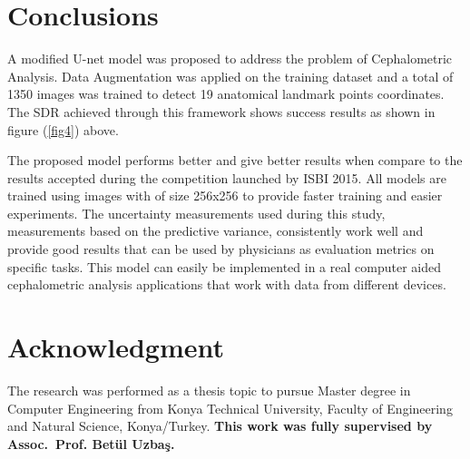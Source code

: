 \documentclass{elektr}
\begin{document}
\section{Conclusions}
\tab A modified U-net model was proposed to address the problem of Cephalometric Analysis. Data Augmentation was applied on the training dataset and a total of 1350 images was trained to detect 19 anatomical landmark points coordinates. The SDR achieved through this framework shows success results as shown in figure (\ref{fig4}) above.  

\tab The proposed model performs better and give better results when compare to the results accepted during the competition launched by ISBI 2015. All models are trained using images with of size 256x256 to provide faster training and easier experiments. The uncertainty measurements used during this study, measurements based on the predictive variance, consistently work well and provide good results that can be used by physicians as evaluation metrics on specific tasks. This model can easily be implemented in a real computer aided cephalometric analysis applications that work with data from different devices. 


\section*{Acknowledgment}
The research was performed as a thesis topic to pursue Master degree in Computer Engineering from Konya Technical University, Faculty of Engineering and Natural Science, Konya/Turkey. \textbf{This work was fully supervised by Assoc. Prof. Betül Uzbaş.} 
\end{document}
